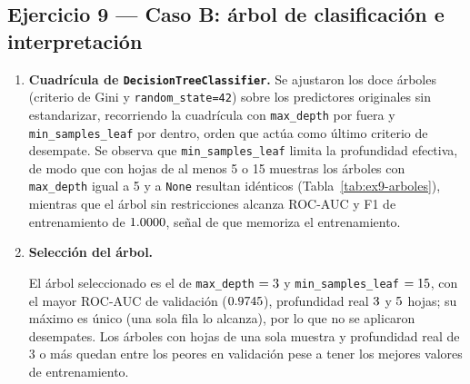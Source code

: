 \subsection{Ejercicio 9 --- Caso B: árbol de clasificación e interpretación}

\begin{enumerate}

\item \textbf{Cuadrícula de \texttt{DecisionTreeClassifier}.}
Se ajustaron los doce árboles (criterio de Gini y
\texttt{random\_state=42}) sobre los predictores originales sin estandarizar,
recorriendo la cuadrícula con \texttt{max\_depth} por fuera y
\texttt{min\_samples\_leaf} por dentro, orden que actúa como último criterio
de desempate. Se observa que \texttt{min\_samples\_leaf} limita la
profundidad efectiva, de modo que con hojas de al menos 5 o 15 muestras los
árboles con \texttt{max\_depth} igual a 5 y a \texttt{None} resultan
idénticos (Tabla~\ref{tab:ex9-arboles}), mientras que el árbol sin
restricciones alcanza ROC-AUC y F1 de entrenamiento de $1.0000$,
señal de que memoriza el entrenamiento.

\item \textbf{Selección del árbol.}

\begin{table}[H]
\centering
\resizebox{\textwidth}{!}{}
\caption{Árboles de clasificación: ROC-AUC y F1 ($\hat y = \mathbf{1}[p\ge 0.5]$) en entrenamiento y validación.}
\label{tab:ex9-arboles}
\end{table}

El árbol seleccionado es el de \texttt{max\_depth} $=3$ y
\texttt{min\_samples\_leaf} $=15$, con el mayor ROC-AUC de
validación ($0.9745$), profundidad real $3$ y
$5$ hojas; su máximo es único (una sola fila lo alcanza), por lo
que no se aplicaron desempates. Los árboles con hojas de una sola muestra y
profundidad real de 3 o más quedan entre los peores en validación pese a
tener los mejores valores de entrenamiento.


\end{enumerate}
